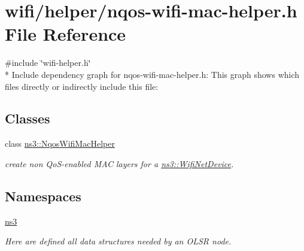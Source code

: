 \hypertarget{nqos-wifi-mac-helper_8h}{}\section{wifi/helper/nqos-\/wifi-\/mac-\/helper.h File Reference}
\label{nqos-wifi-mac-helper_8h}
{\ttfamily \#include \char`\"{}wifi-\/helper.\+h\char`\"{}}\\*
Include dependency graph for nqos-\/wifi-\/mac-\/helper.h\+:
This graph shows which files directly or indirectly include this file\+:
\subsection*{Classes}
\begin{DoxyCompactItemize}
\item 
class \hyperlink{classns3_1_1NqosWifiMacHelper}{ns3\+::\+Nqos\+Wifi\+Mac\+Helper}
\begin{DoxyCompactList}\small\item\em create non Qo\+S-\/enabled M\+AC layers for a \hyperlink{classns3_1_1WifiNetDevice}{ns3\+::\+Wifi\+Net\+Device}. \end{DoxyCompactList}\end{DoxyCompactItemize}
\subsection*{Namespaces}
\begin{DoxyCompactItemize}
\item 
 \hyperlink{namespacens3}{ns3}
\begin{DoxyCompactList}\small\item\em Here are defined all data structures needed by an O\+L\+SR node. \end{DoxyCompactList}\end{DoxyCompactItemize}
